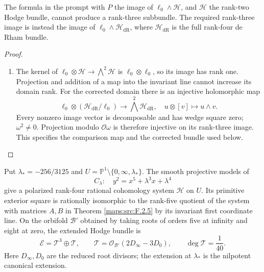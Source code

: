 \begin{theorem}\label{night:P1.5}
The formula in the prompt with $P$ the image of
$\ell_0\wedge\mathcal H$, and $\mathcal H$ the rank-two Hodge bundle,
cannot produce a rank-three subbundle.  The required rank-three image
is instead the image of $\ell_0\wedge\mathcal H_{\mathrm{dR}}$, where
$\mathcal H_{\mathrm{dR}}$ is the full rank-four de Rham bundle.
\end{theorem}
\begin{proof}
\begin{enumerate}[label=\arabic*.]
\item The kernel of $\ell_0\otimes\mathcal H\to\bigwedge^2\mathcal H$
is $\ell_0\otimes\ell_0$, so its image has rank one.  Projection and
addition of a map into the invariant line cannot increase its domain
rank.  For the corrected domain there is an injective holomorphic map
\[
\ell_0\otimes(\mathcal H_{\mathrm{dR}}/\ell_0)
 \longrightarrow\bigwedge^2\mathcal H_{\mathrm{dR}},\quad
u\otimes[v]\longmapsto u\wedge v.
\]
Every nonzero image vector is decomposable and has wedge square zero;
$\omega^2\ne0$.  Projection modulo $\mathcal O\omega$ is therefore
injective on its rank-three image.  This specifies the comparison map
and the corrected bundle used below.

\end{enumerate}
\end{proof}




\begin{theorem}\label{maps:src:F.3.5}


Put $\lambda_*=-256/3125$ and
$U=\mathbb P^1\setminus\{0,\infty,\lambda_*\}$.  The smooth projective
models of
\[
 C_\lambda:\quad y^2=x^5+\lambda^3x+\lambda^4
 \tag{F.7}\label{maps:eq:F.7}
\]
give a polarized rank-four rational cohomology system $\mathcal H$ on
$U$.  Its primitive exterior square is rationally isomorphic to
the rank-five quotient of the system with matrices $A,B$ in
Theorem \ref{maps:src:F.2.5} by its invariant first coordinate line.
On the orbifold $\mathcal B'$ obtained by taking roots of orders
five at infinity and eight at zero, the extended Hodge bundle is
\[
 \mathcal E=\mathcal T^3\oplus\mathcal T,\qquad
 \mathcal T=\mathcal O_{\mathcal B'}(2D_\infty-3D_0),\qquad
 \deg\mathcal T=\frac1{40}.
 \tag{F.8}\label{maps:eq:F.8}
\]
Here $D_\infty,D_0$ are the reduced root divisors; the extension at
$\lambda_*$ is the nilpotent canonical extension.

\end{theorem}


